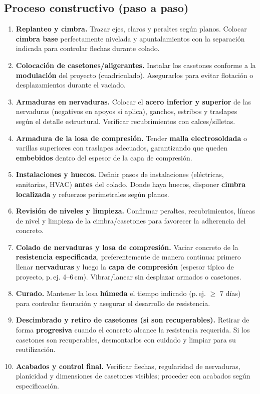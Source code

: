 \documentclass[12pt]{article}
\begin{document}
	\subsection{Proceso constructivo (paso a paso)}
	\begin{enumerate}
		\item \textbf{Replanteo y cimbra.} Trazar ejes, claros y peraltes según planos. Colocar \textbf{cimbra base} perfectamente nivelada y apuntalamientos con la separación indicada para controlar flechas durante colado.
		\item \textbf{Colocación de casetones/aligerantes.} Instalar los casetones conforme a la \textbf{modulación} del proyecto (cuadriculado). Asegurarlos para evitar flotación o desplazamientos durante el vaciado.
		\item \textbf{Armaduras en nervaduras.} Colocar el \textbf{acero inferior y superior} de las nervaduras (negativos en apoyos si aplica), ganchos, estribos y traslapes según el detalle estructural. Verificar recubrimientos con calces/silletas.
		\item \textbf{Armadura de la losa de compresión.} Tender \textbf{malla electrosoldada} o varillas superiores con traslapes adecuados, garantizando que queden \textbf{embebidos} dentro del espesor de la capa de compresión.
		\item \textbf{Instalaciones y huecos.} Definir pasos de instalaciones (eléctricas, sanitarias, HVAC) \textbf{antes} del colado. Donde haya huecos, disponer \textbf{cimbra localizada} y refuerzos perimetrales según planos.
		\item \textbf{Revisión de niveles y limpieza.} Confirmar peraltes, recubrimientos, líneas de nivel y limpieza de la cimbra/casetones para favorecer la adherencia del concreto.
		\item \textbf{Colado de nervaduras y losa de compresión.} Vaciar concreto de la \textbf{resistencia especificada}, preferentemente de manera continua: primero llenar \textbf{nervaduras} y luego la \textbf{capa de compresión} (espesor típico de proyecto, p.\,ej. 4--6\,cm). Vibrar/lanear sin desplazar armados o casetones.
		\item \textbf{Curado.} Mantener la losa \textbf{húmeda} el tiempo indicado (p.\,ej. \(\geq\) 7 días) para controlar fisuración y asegurar el desarrollo de resistencia.
		\item \textbf{Descimbrado y retiro de casetones (si son recuperables).} Retirar de forma \textbf{progresiva} cuando el concreto alcance la resistencia requerida. Si los casetones son recuperables, desmontarlos con cuidado y limpiar para su reutilización.
		\item \textbf{Acabados y control final.} Verificar flechas, regularidad de nervaduras, planicidad y dimensiones de casetones visibles; proceder con acabados según especificación.
	\end{enumerate}
	
\end{document}
